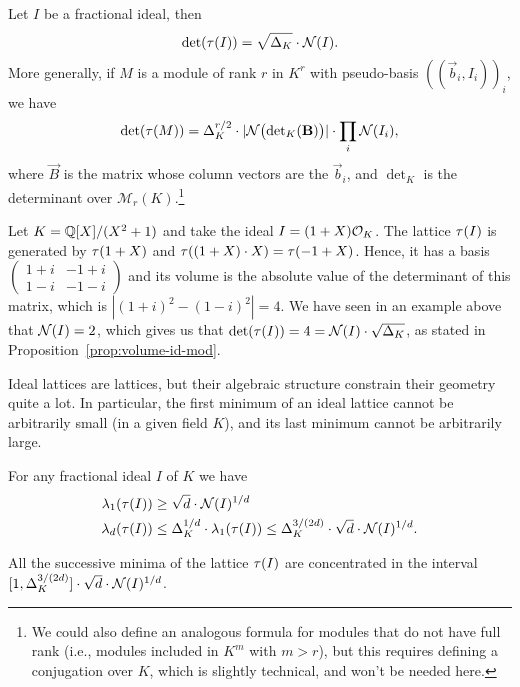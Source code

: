 \begin{proposition}
\label{prop:volume-id-mod}
Let $I$ be a fractional ideal, then
\[ \det(\tau(I)) = \sqrt{\Delta_K}\cdot \mathcal{N}(I) .\]
More generally, if $M$ is a module of rank $r$ in $K^r$ with pseudo-basis $((\vec b_i, I_i))_i$, we have
\[\det(\tau(M)) = \Delta_K^{r/2} \cdot |\mathcal{N}\big({\det}_K(\mathbf B)\big)| \cdot \prod_i \mathcal{N}(I_i),\]
where $\vec B$ is the matrix whose column vectors are the $\vec b_i$, and $\det_K$ is the determinant over $\mathcal{M}_r(K)$.\footnote{We could also define an analogous formula for modules that do not have full rank (i.e., modules included in $K^m$ with $m > r$), but this requires defining a conjugation over $K$, which is slightly technical, and won't be needed here.}
\end{proposition}


\begin{example}
Let $K = \mathbb{Q}[X]/(X^2+1)$ and take the ideal $I = (1+X) \mathcal{O}_K$. The lattice $\tau(I)$ is generated by $\tau(1+X)$ and $\tau((1+X)\cdot X) = \tau(-1+X)$. Hence, it has a basis $\begin{pmatrix}
1+i & -1+i \\ 1-i & -1-i
\end{pmatrix}$ and its volume is the absolute value of the determinant of this matrix, which is $|(1+i)^2 - (1-i)^2| = 4$. We have seen in an example above that $\mathcal{N}(I) = 2$, which gives us that $\det(\tau(I)) = 4 = \mathcal{N}(I) \cdot \sqrt{\Delta_K}$, as stated in Proposition~\ref{prop:volume-id-mod}.
\end{example}

Ideal lattices are lattices, but their algebraic structure constrain their geometry quite a lot. In particular, the first minimum of an ideal lattice cannot be arbitrarily small (in a given field $K$), and its last minimum cannot be arbitrarily large.

\begin{lemma}
\label{lemma:lower-upper-bounds-ideal-lambda_i}
For any fractional ideal $I$ of $K$ we have
\begin{align*}
\lambda_1(\tau(I)) &\geq \sqrt{d} \cdot \mathcal{N}(I)^{1/d} \\
\lambda_d(\tau(I)) & \leq \Delta_K^{1/d} \cdot \lambda_1(\tau(I)) \leq \Delta_K^{3/(2d)} \cdot \sqrt{d} \cdot \mathcal{N}(I)^{1/d}.
\end{align*}
\end{lemma}
All the successive minima of the lattice $\tau(I)$ are concentrated in the interval $[1, \Delta_K^{3/(2d)}] \cdot \sqrt{d} \cdot \mathcal{N}(I)^{1/d}$.

